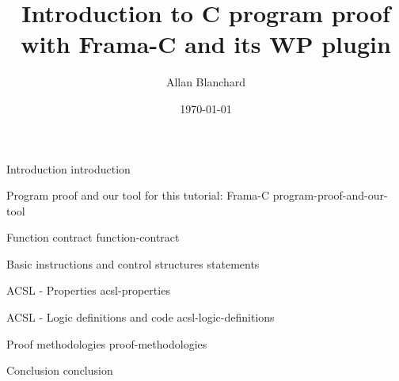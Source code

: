 \documentclass[middle]{zmdocument}
\title{Introduction to C program proof with Frama-C and its WP plugin}
\author{Allan Blanchard}
\date{\today}
\begin{document}
\maketitle
\tableofcontents

\begin{levelOne}
  {Introduction}
  {introduction}
\end{levelOne}

\begin{levelOne}
  {Program proof and our tool for this tutorial: Frama-C}
  {program-proof-and-our-tool}
\end{levelOne}

\begin{levelOne}
  {Function contract}
  {function-contract}
\end{levelOne}

\begin{levelOne}
  {Basic instructions and control structures}
  {statements}
\end{levelOne}

\begin{levelOne}
  {ACSL - Properties}
  {acsl-properties}
\end{levelOne}

\begin{levelOne}
  {ACSL - Logic definitions and code}
  {acsl-logic-definitions}
\end{levelOne}

\begin{levelOne}
  {Proof methodologies}
  {proof-methodologies}
\end{levelOne}

\begin{levelOne}
  {Conclusion}
  {conclusion}
\end{levelOne}
\end{document}
